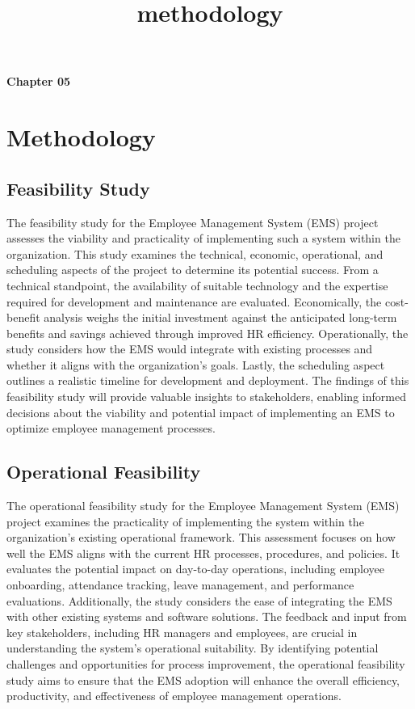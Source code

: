 \title{methodology}
\begin{center}
    \textbf{Chapter 05}\\
   \section{ \large \textbf{Methodology}}
\end{center}
\vspace{2.5mm}
\subsection{Feasibility Study}
The feasibility study for the Employee Management System (EMS) project assesses the viability
and practicality of implementing such a system within the organization. This study examines the
technical, economic, operational, and scheduling aspects of the project to determine its
potential success. From a technical standpoint, the availability of suitable technology and the
expertise required for development and maintenance are evaluated. Economically, the cost-
benefit analysis weighs the initial investment against the anticipated long-term benefits and
savings achieved through improved HR efficiency. Operationally, the study considers how the
EMS would integrate with existing processes and whether it aligns with the organization's goals.
Lastly, the scheduling aspect outlines a realistic timeline for development and deployment. The
findings of this feasibility study will provide valuable insights to stakeholders, enabling informed
decisions about the viability and potential impact of implementing an EMS to optimize employee
management processes.
\subsection{Operational Feasibility}
The operational feasibility study for the Employee Management System (EMS) project examines
the practicality of implementing the system within the organization's existing operational
framework. This assessment focuses on how well the EMS aligns with the current HR processes,
procedures, and policies. It evaluates the potential impact on day-to-day operations, including
employee onboarding, attendance tracking, leave management, and performance evaluations.
Additionally, the study considers the ease of integrating the EMS with other existing systems and
software solutions. The feedback and input from key stakeholders, including HR managers and
employees, are crucial in understanding the system's operational suitability. By identifying
potential challenges and opportunities for process improvement, the operational feasibility
study aims to ensure that the EMS adoption will enhance the overall efficiency, productivity, and
effectiveness of employee management operations.
\newpage
